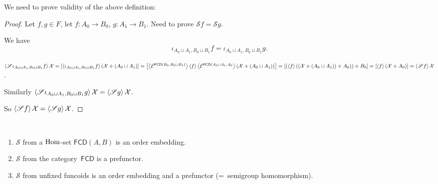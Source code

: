 We need to prove validity of the above definition:

\begin{proof}
Let $f,g\in F$, let $f:A_0\to B_0$, $g:A_1\to B_1$.
Need to prove $\mathscr{S}f=\mathscr{S}g$.

We have
\[\iota_{A_0\sqcup A_1,B_0\sqcup B_1}f=\iota_{A_0\sqcup A_1,B_0\sqcup B_1}g.\]

$\left\langle \mathscr{S}\iota_{A_0\sqcup A_1,B_0\sqcup B_1}f\right\rangle\mathcal{X}=
[\left\langle \iota_{A_0\sqcup A_1,B_0\sqcup B_1}f\right\rangle(\mathcal{X}\div(A_0\sqcup A_1)]=
\left[\left\langle \mathcal{E}^{\mathsf{FCD}(B_0,B_0\sqcup B_1)}\right\rangle\left\langle f\right\rangle\left\langle \mathcal{E}^{\mathsf{FCD}(A_0\sqcup A_1,A_0}\right\rangle(\mathcal{X}\div(A_0\sqcup A_1))\right]=
[(\left\langle f\right\rangle((\mathcal{X}\div(A_0\sqcup A_1))\div A_0))
\div B_0]=
[\left\langle f\right\rangle(\mathcal{X}\div A_0)]=
\left\langle \mathscr{S}f\right\rangle\mathcal{X}$.

Similarly
$\left\langle \mathscr{S}\iota_{A_0\sqcup A_1,B_0\sqcup B_1}g\right\rangle\mathcal{X}=
\left\langle \mathscr{S}g\right\rangle\mathcal{X}$.

So $\left\langle \mathscr{S}f\right\rangle\mathcal{X}=
\left\langle \mathscr{S}g\right\rangle\mathcal{X}$.
\end{proof}

\begin{prop}\label{s-fcd}
~
\begin{enumerate}
\item\label{s-fcd-hom} $\mathscr{S}$ from a $\operatorname{Hom}$-set $\mathsf{FCD}(A,B)$
is an order embedding.
\item\label{s-fcd-fctr} $\mathscr{S}$ from the category~$\mathsf{FCD}$
is a prefunctor.
\item\label{s-fcd-unfix} $\mathscr{S}$ from unfixed funcoids is an order embedding and a prefunctor (=~semigroup homomorphism).
\end{enumerate}
\end{prop}

